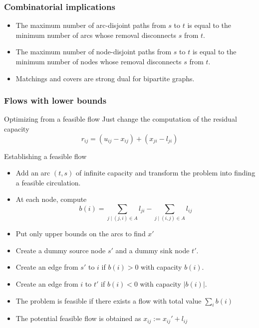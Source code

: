 \documentclass[9pt]{beamer}
\begin{document}
\begin{frame}
\frametitle{Combinatorial implications}
\begin{itemize}
\item<1-> The maximum number of \alert{arc-disjoint paths} from $s$ to $t$
is equal to the minimum number of arcs whose \alert{removal disconnects} $s$ from $t$.
\item<1-> The maximum number of \alert{node-disjoint} paths from $s$ to $t$ is
equal to the minimum number of \alert{nodes whose removal} disconnects $s$ from $t$.
\item<1-> Matchings and covers are strong dual for \alert{bipartite graphs}.
\end{itemize}
\end{frame}
\begin{frame}
\frametitle{Flows with lower bounds}
\begin{block}{Optimizing from a feasible flow}
Just change the computation of the \alert{residual capacity}
$$ r_{ij} = (u_{ij}-x_{ij}) + (x_{ji}-l_{ji})$$
\end{block}
\begin{block}{Establishing a feasible flow}
\begin{itemize}
\item<2-> Add an arc $(t,s)$ of \alert{infinite capacity}
and transform the problem into finding a \alert{feasible circulation}.
\item<2-> At each node, compute 
$$b(i) = \sum_{j\mid (j,i)\in A} l_{ji} - \sum_{j\mid (i,j)\in A} l_{ij}$$
\item<2-> Put only \alert{upper bounds} on the arcs to find $x'$
\item<2-> Create a \alert{dummy source node} $s'$ and a \alert{dummy sink node} $t'$.
\item<2-> Create an edge from $s'$ to $i$ if $b(i)>0$ with capacity $b(i)$.
\item<2-> Create an edge from $i$ to $t'$ if $b(i)<0$ with capacity $|b(i)|$.
\item<2-> The problem is feasible if there exists a flow with total value $\sum_ib(i)$
\item<2-> The potential feasible flow is obtained as $x_{ij}:=x_{ij}'+l_{ij}$
\end{itemize}
\end{block}
\end{frame}
\end{document}
